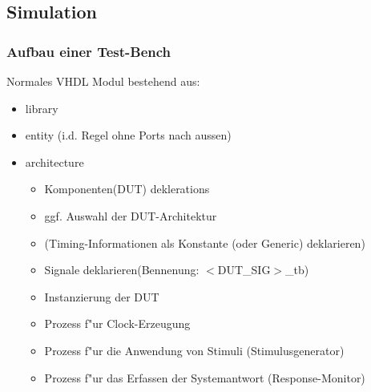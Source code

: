 	\subsection{Simulation}
		\subsubsection{Aufbau einer Test-Bench}
			\begin{multicols}{2}
				Normales VHDL Modul bestehend aus:
				\begin{itemize}
					\item library
					\item entity (i.d. Regel ohne Ports nach aussen)
					\item architecture
						\begin{itemize}
							\item Komponenten(DUT) deklerations
							\item ggf. Auswahl der DUT-Architektur
							\item (Timing-Informationen als Konstante (oder 
								Generic) deklarieren)
							\item Signale deklarieren(Bennenung: $<$DUT\_SIG$>$\_tb)
							\item Instanzierung der DUT
							\item Prozess f"ur Clock-Erzeugung
							\item Prozess f"ur die Anwendung von Stimuli 
								(Stimulusgenerator)
							\item Prozess f"ur das Erfassen der Systemantwort 
								(Response-Monitor)
						\end{itemize}
				\end{itemize}
			\end{multicols}

